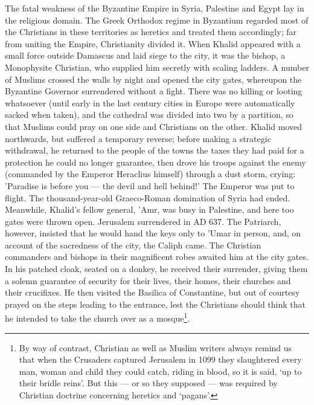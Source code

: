 \documentclass[10pt, twoside]{book}
\begin{document}
The fatal weakness of the Byzantine Empire in Syria, Palestine and Egypt lay in the religious domain. The Greek Orthodox regime in Byzantium regarded most of the Christians in these territories as heretics and treated them accordingly; far from uniting the Empire, Christianity divided it. When Khalid appeared with a small force outside Damascus and laid siege to the city, it was the bishop, a Monophysite Christian, who supplied him secretly with scaling ladders. A number of Muslims crossed the walls by night and opened the city gates, whereupon the Byzantine Governor surrendered without a fight. There was no killing or looting whatsoever (until early in the last century cities in Europe were automatically sacked when taken), and the cathedral was divided into two by a partition, so that Muslims could pray on one side and Christians on the other. Khalid moved northwards, but suffered a temporary reverse; before making a strategic withdrawal, he returned to the people of the towns the taxes they had paid for a protection he could no longer guarantee, then drove his troops against the enemy (commanded by the Emperor Heraclius himself) through a dust storm, crying: 'Paradise is before you --- the devil and hell behind!' The Emperor was put to flight. The thousand\hyp{}year\hyp{}old Graeco\hyp{}Roman domination of Syria had ended. \\

Meanwhile, Khalid's fellow general, 'Amr, was busy in Palestine, and here too gates were thrown open. Jerusalem surrendered in AD 637. The Patriarch, however, insisted that he would hand the keys only to 'Umar in person, and, on account of the sacredness of the city, the Caliph came. The Christian commanders and bishops in their magnificent robes awaited him at the city gates. In his patched cloak, seated on a donkey, he received their surrender, giving them a solemn guarantee of security for their lives, their homes, their churches and their crucifixes. He then visited the Basilica of Constantine, but out of courtesy prayed on the steps leading to the entrance, lest the Christians should think that he intended to take the church over as a mosque\footnote{By way of contrast, Christian as well as Muslim writers always remind us that when the Crusaders captured Jerusalem in 1099 they slaughtered every man, woman and child they could catch, riding in blood, so it is said, `up to their bridle reins'. But this --- or so they supposed --- was required by Christian doctrine concerning heretics and `pagans'.}.\\
\end{document}
